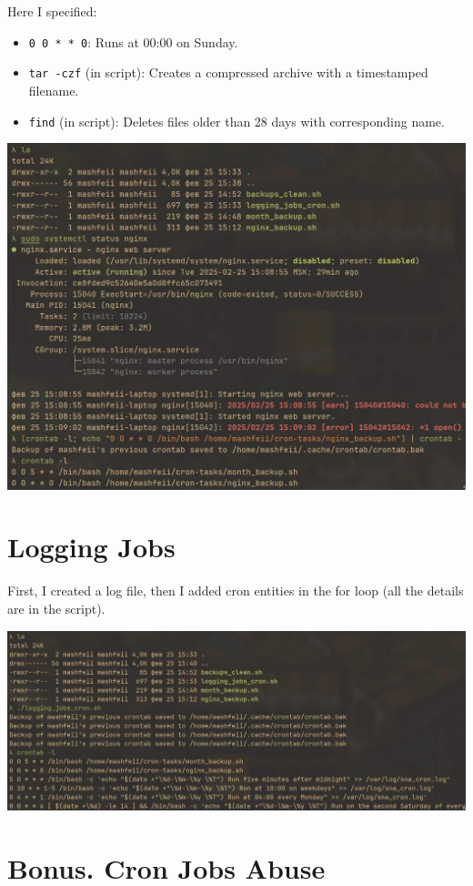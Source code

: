 \documentclass{article}
\newcommand{\code}[1]{\colorbox{light-gray}{\texttt{#1}}}
\begin{document}
Here I specified:
\begin{itemize}
	\item \code{0 0 * * 0}: Runs at 00:00 on Sunday.
	\item \code{tar -czf} (in script): Creates a compressed archive with a timestamped filename.
	\item \code{find} (in script): Deletes files older than 28 days with corresponding name.
\end{itemize}

\includegraphics[width=460pt]{6_3.jpg}
\newpage

\section{Logging Jobs}
\noindent

First, I created a log file, then I added cron entities in the for loop (all the details are in the script).

\includegraphics[width=460pt]{6_4.jpg}

\section{Bonus. Cron Jobs Abuse}
\end{document}
